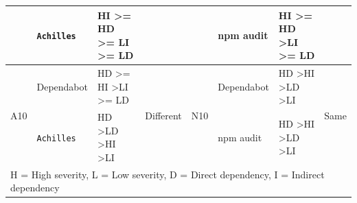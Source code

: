 \documentclass[conference]{IEEEtran}
\begin{document}
\begin{table}[tb]
\begin{tabular}{clll|clll}
			& \texttt{Achilles}   & HI \textgreater{}= HD \textgreater{}= LI \textgreater{}= LD &                                 & & npm audit & HI \textgreater{}= HD \textgreater LI \textgreater{}= LD &  \\ 
			\midrule
			\multirow{2}{*}{A10} & Dependabot & HD \textgreater{}= HI \textgreater LI \textgreater{}= LD    & \multirow{2}{*}{Different}      & \multirow{2}{*}{N10} & Dependabot & HD \textgreater HI \textgreater LD \textgreater LI & \multirow{2}{*}{Same} \\ 
			& \texttt{Achilles}   & HD \textgreater LD \textgreater HI \textgreater LI          &                                 & & npm audit & HD \textgreater HI \textgreater LD \textgreater LI & \\ 
			\bottomrule
			\multicolumn{8}{l}{H = High severity, L = Low severity, D = Direct dependency, I = Indirect dependency} \\
		\end{tabular}
		\label{table:ach-indirect}
	\end{table}
	
\end{document}
